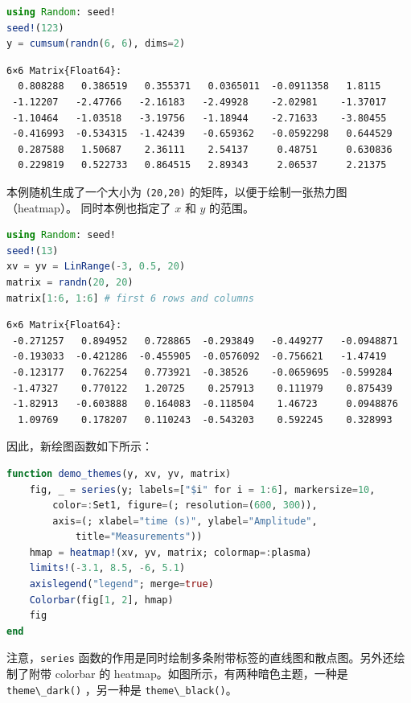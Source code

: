 \documentclass[
  notoc %
]{tufte-book}
\newcommand{\passthrough}[1]{#1}
\begin{document}
\begin{lstlisting}[language=Julia]
using Random: seed!
seed!(123)
y = cumsum(randn(6, 6), dims=2)
\end{lstlisting}

\begin{lstlisting}[language=Output]
6×6 Matrix{Float64}:
  0.808288   0.386519   0.355371   0.0365011  -0.0911358   1.8115
 -1.12207   -2.47766   -2.16183   -2.49928    -2.02981    -1.37017
 -1.10464   -1.03518   -3.19756   -1.18944    -2.71633    -3.80455
 -0.416993  -0.534315  -1.42439   -0.659362   -0.0592298   0.644529
  0.287588   1.50687    2.36111    2.54137     0.48751     0.630836
  0.229819   0.522733   0.864515   2.89343     2.06537     2.21375
\end{lstlisting}

本例随机生成了一个大小为 \passthrough{\lstinline!(20,20)!}
的矩阵，以便于绘制一张热力图（heatmap）。 同时本例也指定了 \(x\) 和
\(y\) 的范围。

\begin{lstlisting}[language=Julia]
using Random: seed!
seed!(13)
xv = yv = LinRange(-3, 0.5, 20)
matrix = randn(20, 20)
matrix[1:6, 1:6] # first 6 rows and columns
\end{lstlisting}

\begin{lstlisting}[language=Output]
6×6 Matrix{Float64}:
 -0.271257   0.894952   0.728865  -0.293849   -0.449277   -0.0948871
 -0.193033  -0.421286  -0.455905  -0.0576092  -0.756621   -1.47419
 -0.123177   0.762254   0.773921  -0.38526    -0.0659695  -0.599284
 -1.47327    0.770122   1.20725    0.257913    0.111979    0.875439
 -1.82913   -0.603888   0.164083  -0.118504    1.46723     0.0948876
  1.09769    0.178207   0.110243  -0.543203    0.592245    0.328993
\end{lstlisting}

因此，新绘图函数如下所示：

\begin{lstlisting}[language=Julia]
function demo_themes(y, xv, yv, matrix)
    fig, _ = series(y; labels=["$i" for i = 1:6], markersize=10,
        color=:Set1, figure=(; resolution=(600, 300)),
        axis=(; xlabel="time (s)", ylabel="Amplitude",
            title="Measurements"))
    hmap = heatmap!(xv, yv, matrix; colormap=:plasma)
    limits!(-3.1, 8.5, -6, 5.1)
    axislegend("legend"; merge=true)
    Colorbar(fig[1, 2], hmap)
    fig
end
\end{lstlisting}

注意，\passthrough{\lstinline!series!}
函数的作用是同时绘制多条附带标签的直线图和散点图。另外还绘制了附带
colorbar 的 heatmap。如图所示，有两种暗色主题，一种是
\passthrough{\lstinline!theme\_dark()!} ，另一种是
\passthrough{\lstinline!theme\_black()!}。
\end{document}
